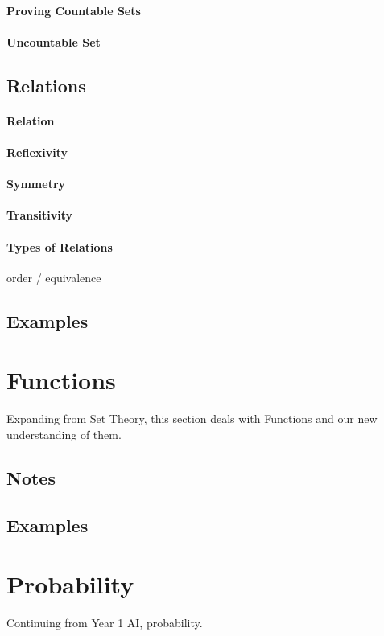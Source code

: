 \paragraph{Proving Countable Sets}
\paragraph{Uncountable Set}

\subsection{Relations}
\paragraph{Relation}
\paragraph{Reflexivity}
\paragraph{Symmetry}
\paragraph{Transitivity}
\paragraph{Types of Relations}
order / equivalence
\subsection{Examples}

\section{Functions}
Expanding from Set Theory, this section deals with Functions and our new understanding of them.
\subsection{Notes}
\subsection{Examples}

\section{Probability}
Continuing from Year 1 AI, probability.
